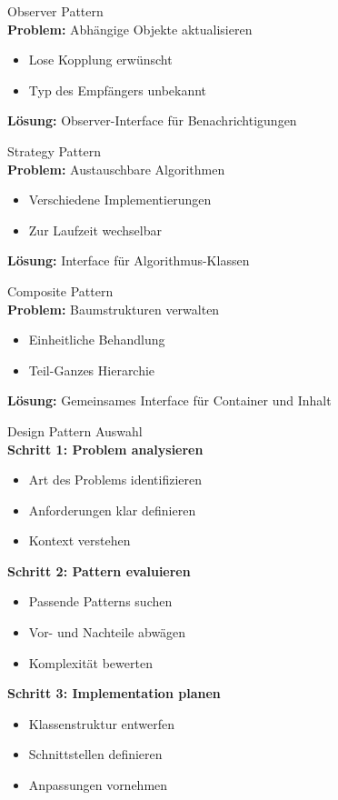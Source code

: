 \begin{definition}{Observer Pattern}\\
\textbf{Problem:} Abhängige Objekte aktualisieren
\begin{itemize}
    \item Lose Kopplung erwünscht
    \item Typ des Empfängers unbekannt
\end{itemize}
\textbf{Lösung:} Observer-Interface für Benachrichtigungen
\end{definition}

\begin{definition}{Strategy Pattern}\\
\textbf{Problem:} Austauschbare Algorithmen
\begin{itemize}
    \item Verschiedene Implementierungen
    \item Zur Laufzeit wechselbar
\end{itemize}
\textbf{Lösung:} Interface für Algorithmus-Klassen
\end{definition}

\begin{definition}{Composite Pattern}\\
\textbf{Problem:} Baumstrukturen verwalten
\begin{itemize}
    \item Einheitliche Behandlung
    \item Teil-Ganzes Hierarchie
\end{itemize}
\textbf{Lösung:} Gemeinsames Interface für Container und Inhalt
\end{definition}

\begin{KR}{Design Pattern Auswahl}\\
\textbf{Schritt 1: Problem analysieren}
\begin{itemize}
    \item Art des Problems identifizieren
    \item Anforderungen klar definieren
    \item Kontext verstehen
\end{itemize}

\textbf{Schritt 2: Pattern evaluieren}
\begin{itemize}
    \item Passende Patterns suchen
    \item Vor- und Nachteile abwägen
    \item Komplexität bewerten
\end{itemize}

\textbf{Schritt 3: Implementation planen}
\begin{itemize}
    \item Klassenstruktur entwerfen
    \item Schnittstellen definieren
    \item Anpassungen vornehmen
\end{itemize}
\end{KR}

